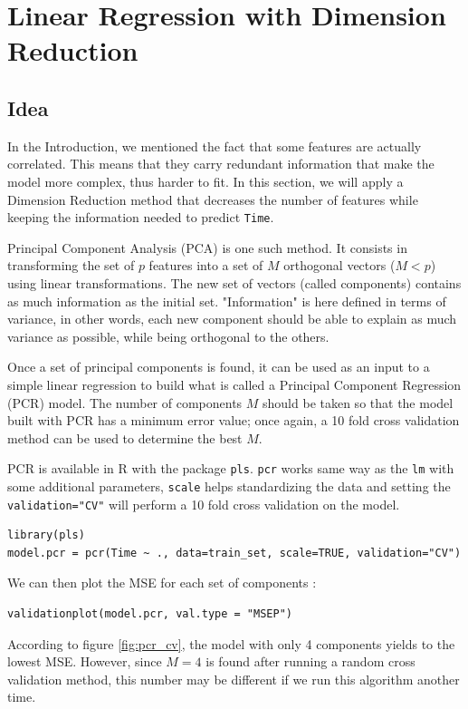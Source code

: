 \documentclass[]{report}
\begin{document}
\section{Linear Regression with Dimension Reduction}
\subsection{Idea}
In the Introduction, we mentioned the fact that some features are actually correlated. This means that they carry redundant information that make the model more complex, thus harder to fit. In this section, we will apply a Dimension Reduction method that decreases the number of features while keeping the information needed to predict \texttt{Time}.

Principal Component Analysis (PCA) is one such method. It consists in transforming the set of $p$ features into a set of $M$ orthogonal vectors ($M < p$) using linear transformations. The new set of vectors (called components) contains as much information as the initial set. "Information" is here defined in terms of variance, in other words, each new component should be able to explain as much variance as possible, while being orthogonal to the others.

Once a set of principal components is found, it can be used as an input to a simple linear regression to build what is called a Principal Component Regression (PCR) model. The number of components $M$ should be taken so that the model built with PCR has a minimum error value; once again, a 10 fold cross validation method can be used to determine the best $M$.

PCR is available in R with the package \texttt{pls}. \texttt{pcr} works same way as the \texttt{lm} with some additional parameters, \texttt{scale} helps standardizing the data and setting the \texttt{validation="CV"} will perform a 10 fold cross validation on the model.
\begin{lstlisting}
library(pls)
model.pcr = pcr(Time ~ ., data=train_set, scale=TRUE, validation="CV")
\end{lstlisting}

We can then plot the MSE for each set of components :
\begin{lstlisting}
validationplot(model.pcr, val.type = "MSEP")
\end{lstlisting}

According to figure \ref{fig:pcr_cv}, the model with only 4 components yields to the lowest MSE. However, since $M = 4$ is found after running a random cross validation method, this number may be different if we run this algorithm another time.
\end{document}
